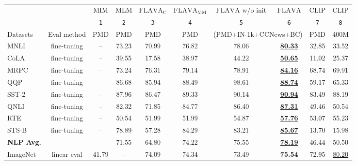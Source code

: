 \documentclass[10pt,twocolumn,letterpaper]{article}
\begin{document}
\begin{table*}[t]
\vspace{-1.5em}
\centering
\footnotesize
\begin{tabular}{l@{\ }c|ccccccc|c}
\toprule
&  & \multicolumn{1}{c}{MIM} & \multicolumn{1}{c}{MLM} &
\multicolumn{1}{c}{$\mathrm{FLAVA}_\mathrm{C}$} & \multicolumn{1}{c}{$\mathrm{FLAVA}_\mathrm{MM}$}  & \multicolumn{1}{c}{$\mathrm{FLAVA}$ w/o init} & \multicolumn{1}{c}{$\mathrm{FLAVA}$} & \multicolumn{1}{c|}{CLIP} & \multicolumn{1}{c}{CLIP} \\
&  & \small\texttt{1} & \small\texttt{2} & \small\texttt{3} & \small\texttt{4} & \small\texttt{5} & \small\texttt{6} & \small\texttt{7} & \small\texttt{8}   \\
\midrule 
Datasets & Eval method &  PMD & PMD &  PMD & PMD & \multicolumn{2}{c}{(PMD+IN-1k+CCNews+BC)} & PMD & 400M\cite{radford2021learning} \\
\midrule 
MNLI \cite{williams2018broad} & fine-tuning & -- & 73.23 & 70.99 & 76.82 & 78.06 & \underline{\textbf{80.33}} & 32.85 & 33.52 \\
CoLA \cite{warstadt2019neural} & fine-tuning & -- & 39.55 & 17.58 & 38.97 & 44.22 & \underline{\textbf{50.65}} & 11.02 & 25.37 \\
MRPC \cite{mrpc2005} & fine-tuning & -- & 73.24 & 76.31 & 79.14 & 78.91 & \underline{\textbf{84.16}} & 68.74 & 69.91 \\
QQP \cite{qqp} & fine-tuning & -- & 86.68 & 85.94 & 88.49 & 98.61 & \underline{\textbf{88.74}} & 59.17 & 65.33 \\
SST-2 \cite{sst2013} & fine-tuning & -- & 87.96 & 86.47 & 89.33 & 90.14 & \underline{\textbf{90.94}} & 83.49 & 88.19 \\
QNLI \cite{rajpurkar2016squad} & fine-tuning & -- & 82.32 & 71.85 & 84.77 & 86.40 & \underline{\textbf{87.31}} & 49.46 & 50.54 \\
RTE \cite{dagan2006pascal,bar2006second,giampiccolo2007third,bentivogli2009fifth} & fine-tuning & -- & 50.54 & 51.99 & 51.99 & 54.87 & \underline{\textbf{57.76}} & 53.07 & 55.23 \\
STS-B \cite{agirre2007semantic} & fine-tuning & -- & 78.89 & 57.28 & 84.29 & 83.21 & \underline{\textbf{85.67}} & 13.70 & 15.98 \\
\midrule 
\textbf{NLP Avg.} &  & -- & 71.55 & 64.80 & 74.22 & 75.55 & \underline{\textbf{78.19}} & 46.44 & 50.50 \\
\midrule 
ImageNet \cite{imagenet} & linear eval & 41.79 & -- & 74.09 & 74.34 & 73.49 & \textbf{75.54} & 72.95 & \underline{80.20} \\

\end{tabular}
\end{table*}
\end{document}
